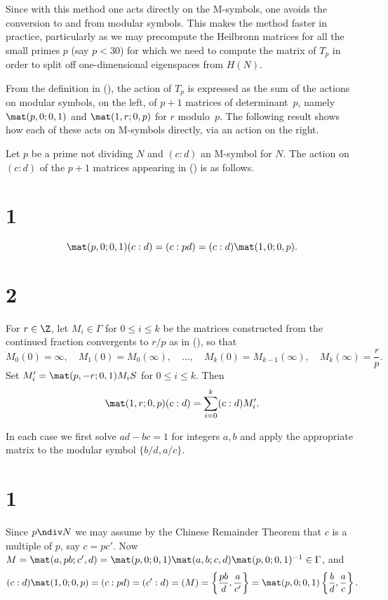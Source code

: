 Since with this method one acts directly on the M-symbols, one avoids
the conversion to and from modular symbols.  This makes the method
faster in practice, particularly as we may precompute the Heilbronn
matrices for all the small primes $p$ (say $p<30$) for which we need
to compute the matrix of $T_p$ in order to split off one-dimensional
eigenspaces from $H(N)$.

From the definition in (\mhecke), the action of $T_p$ is expressed as
the sum of the actions on modular symbols, on the left, of $p+1$
matrices of determinant~$p$, namely $\mat(p,0;0,1)$ and
$\mat(1,r;0,p)$ for $r$ modulo~$p$.  The following result shows how
each of these acts on M-symbols directly, via an action on the right.

\newprop\heilprop
{}Let $p$ be a prime not dividing $N$
and $(c:d)$ an M-symbol for $N$.  The action on $(c:d)$ of the $p+1$
matrices appearing in {\rm(\mhecke)} is as follows.
\part{1}
$$
   \mat(p,0;0,1)(c:d) = (c:pd) = (c:d)\mat(1,0;0,p).
$$
\part{2}For $r\in\Z$,  let $M_i\in\Gamma$ for $0\le i\le k$ be the
matrices constructed from the continued fraction convergents to $r/p$
as in {\rm(\cfexpa)}, so that
$$
   M_0(0)=\infty,\quad 
   M_1(0)=M_0(\infty),\quad\ldots,\quad 
   M_k(0)=M_{k-1}(\infty),\quad
   M_k(\infty)=\frac{r}{p}.
$$
Set $M_i'=\mat(p,-r;0,1)M_iS$ for $0\le i\le k$.  Then
$$
   \mat(1,r;0,p)(c:d) = \sum_{i=0}^{k}(c:d)M_i'.
$$
\endproclaim

In each case we first solve $ad-bc=1$ for integers $a,b$
and apply the appropriate matrix to the modular symbol $\{b/d,a/c\}$. 

\part{1}Since $p\ndiv N$ we may assume by the Chinese Remainder
Theorem that $c$ is a multiple of $p$, say $c=pc'$.  Now
$M=\mat(a,pb;c',d)=\mat(p,0;0,1)\mat(a,b;c,d)\mat(p,0;0,1)^{-1}\in\Gamma$,
and
$$
   (c:d)\mat(1,0;0,p) = (c:pd) = (c':d) = (M) =
\left\{\frac{pb}{d},\frac{a}{c'}\right\} = \mat(p,0;0,1)\left\{\frac{b}{d},\frac{a}{c}\right\}.
$$

